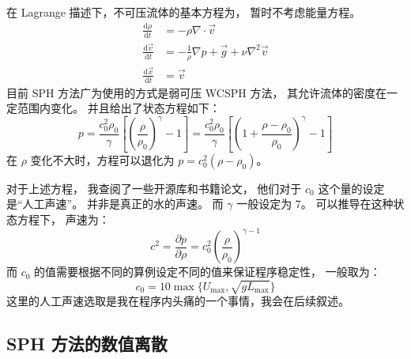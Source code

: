 \begin{frame}
    在 Lagrange 描述下，不可压流体的基本方程为，
    暂时不考虑能量方程。
    \begin{equation}
        \begin{aligned}
            \frac{\mathrm{d} \rho}{\mathrm{d} t} &= -\rho \nabla \cdot \vec{v} \\
            \frac{\mathrm{d} \vec{v}}{\mathrm{d} t} &= -\frac{1}{\rho} \nabla p + \vec{g} + \nu \nabla^2 \vec{v}\\
            \frac{\mathrm{d} \vec{x}}{\mathrm{d} t} &= \vec{v}
        \end{aligned}
    \end{equation}
    目前 SPH 方法广为使用的方式是弱可压 WCSPH 方法，
    其允许流体的密度在一定范围内变化。
    并且给出了状态方程如下：
    \begin{equation}
        p = \frac{c_0^2\rho_0}{\gamma}
        \left[\left(\frac{\rho}{\rho_0}\right)^\gamma - 1\right]=
        \frac{c_0^2\rho_0}{\gamma}
        \left[\left(1+\frac{\rho-\rho_0}{\rho_0}\right)^\gamma - 1\right]
    \end{equation}
    在 $\rho$ 变化不大时，方程可以退化为 $p=c_0^2(\rho-\rho_0)$。
\end{frame}

\begin{frame}
    对于上述方程，
    我查阅了一些开源库和书籍论文，
    他们对于 $c_0$ 这个量的设定是“人工声速”。
    并非是真正的水的声速。
    而 $\gamma$ 一般设定为 $7$。
    可以推导在这种状态方程下，
    声速为：
    \begin{equation}
        c^2=\frac{\partial p}{\partial \rho}=c_0^2\left(\frac{\rho}{\rho_0}\right)^{\gamma - 1}
    \end{equation}
    而 $c_0$ 的值需要根据不同的算例设定不同的值来保证程序稳定性，
    一般取为：
    \begin{equation}
        c_0 = 10\max \{U_{\max}, \sqrt{g L_{\max}}\}
    \end{equation}
    这里的人工声速选取是我在程序内头痛的一个事情，我会在后续叙述。
\end{frame}

\subsection{SPH 方法的数值离散}

